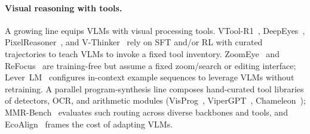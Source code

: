 \paragraph{Visual reasoning with tools.}
A growing line equips VLMs with visual processing tools. VTool-R1~\citep{DBLP:journals/corr/abs-2505-19255},
DeepEyes~\citep{DBLP:journals/corr/abs-2505-14362,DBLP:journals/corr/abs-2511-05271},
PixelReasoner~\citep{DBLP:journals/corr/abs-2505-15966}, and V-Thinker~\citep{DBLP:journals/corr/abs-2511-04460} rely on
SFT and/or RL with curated trajectories to teach VLMs to invoke a fixed tool inventory.
ZoomEye~\citep{DBLP:conf/emnlp/ShenZZXZZY25} and ReFocus~\citep{DBLP:conf/icml/FuLYCLY0FZ25}
are training-free but assume a fixed zoom/search or editing interface;
Lever~LM~\citep{DBLP:conf/nips/YangPMXZHZ24} configures in-context example sequences to
leverage VLMs without retraining. A parallel program-synthesis line composes hand-curated
tool libraries of detectors, OCR, and arithmetic modules
(VisProg~\citep{DBLP:conf/cvpr/GuptaK23}, ViperGPT~\citep{DBLP:conf/iccv/SurisMV23},
Chameleon~\citep{DBLP:conf/nips/LuPCGCWZG23}); MMR-Bench~\citep{DBLP:journals/corr/abs-2601-17814}
evaluates such routing across diverse backbones and tools, and
EcoAlign~\citep{DBLP:journals/corr/abs-2511-11301} frames the cost of adapting VLMs.
